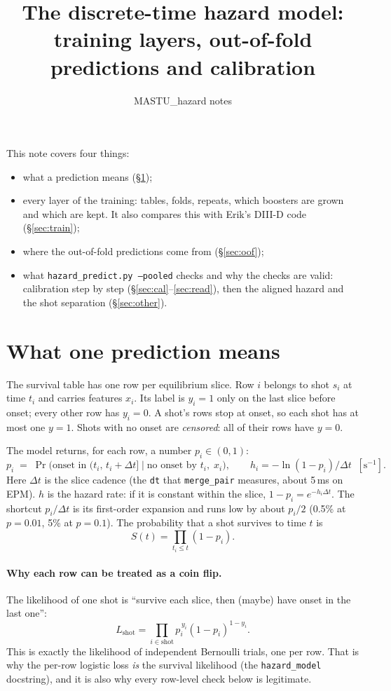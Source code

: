 \documentclass[11pt]{article}
\title{The discrete-time hazard model:\\training layers, out-of-fold predictions and calibration}
\author{MASTU\_hazard notes}
\date{}
\begin{document}
\sloppy
\maketitle

This note covers four things:
\begin{itemize}
\item what a prediction means (\S\ref{sec:row});
\item every layer of the training: tables, folds, repeats, which boosters are
  grown and which are kept. It also compares this with Erik's DIII-D code
  (\S\ref{sec:train});
\item where the out-of-fold predictions come from (\S\ref{sec:oof});
\item what \texttt{hazard\_predict.py --pooled} checks and why the checks are
  valid: calibration step by step (\S\ref{sec:cal}--\ref{sec:read}), then the
  aligned hazard and the shot separation (\S\ref{sec:other}).
\end{itemize}

\section{What one prediction means}\label{sec:row}

The survival table has one row per equilibrium slice. Row $i$ belongs to shot
$s_i$ at time $t_i$ and carries features $x_i$. Its label is $y_i=1$ only on
the last slice before onset; every other row has $y_i=0$. A shot's rows stop at
onset, so each shot has at most one $y=1$. Shots with no onset are
\emph{censored}: all of their rows have $y=0$.

The model returns, for each row, a number $p_i\in(0,1)$:
\[
p_i \;=\; \Pr\bigl(\text{onset in } (t_i,\,t_i+\Delta t] \;\big|\; \text{no onset by } t_i,\; x_i\bigr),
\qquad
h_i = -\ln(1-p_i)/\Delta t \;\;[\mathrm{s}^{-1}] .
\]
Here $\Delta t$ is the slice cadence (the \texttt{dt} that \texttt{merge\_pair}
measures, about 5\,ms on EPM). $h$ is the hazard rate: if it is constant
within the slice, $1-p_i=e^{-h_i\Delta t}$. The shortcut $p_i/\Delta t$ is its
first-order expansion and runs low by about $p_i/2$ (0.5\% at $p=0.01$, 5\% at
$p=0.1$). The probability that a
shot survives to time $t$ is
\[
S(t)=\prod_{t_i\le t}(1-p_i).
\]

\paragraph{Why each row can be treated as a coin flip.}
The likelihood of one shot is ``survive each slice, then (maybe) have onset in
the last one'':
\[
L_{\text{shot}}=\prod_{i\in\text{shot}} p_i^{\,y_i}(1-p_i)^{1-y_i}.
\]
This is exactly the likelihood of independent Bernoulli trials, one per row.
That is why the per-row logistic loss \emph{is} the survival likelihood (the
\texttt{hazard\_model} docstring), and it is also why every row-level check
below is legitimate.
\end{document}
